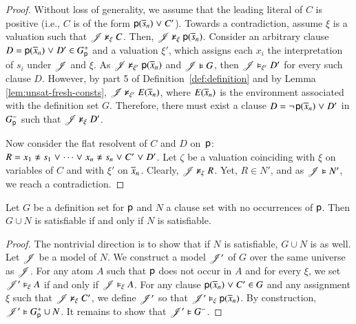 \begin{rep}
\begin{proof}
      Without loss of generality,
      we assume that the leading literal of $C$ is positive (i.e., $C$ is of the form ${\mathsf{p}(\overline{s}_{n})} \mathrel{\lor} C'$).
      Towards a contradiction, assume $\xi$ is a valuation such that $\mathscr{J} \nvDash_\xi C$. Then, $\mathscr{J} \nvDash_\xi
      {\mathsf{p}(\overline{s}_{n})}$. 
      Consider an arbitrary clause $D = {\mathsf{p}}(\overline{x}_{n}) \mathrel{\lor} D'
      \in G^+_{\mathsf{p}}$ and a valuation $\xi'$, which assigns each $x_i$ the
      interpretation of $s_i$ under $\mathscr{J}$ and $\xi$. As $\mathscr{J} \nvDash_{\xi'}
      {\mathsf{p}}(\overline{x}_{n})$ and $\mathscr{J} \vDash G$, then $\mathscr{J} \vDash_{\xi'} D'$ for every
      such clause $D$.
      However, by part 5 of Definition~\ref{def:definition} and by Lemma
      \ref{lem:unsat-fresh-consts}, $\mathscr{J} \nvDash_{\xi'} E(\overline{x}_{n})$, where $E(\overline{x}_{n})$
      is the environment associated with the definition set $G$.
      Therefore, there must exist a clause $D =
      \neg{\kern.2ex \relax{\mathsf{p}(\overline{x}_{n})}} \mathrel{\lor} D'$ in $G^-_{\mathsf{p}}$ such
      that $\mathscr{J} \nvDash_\xi D'$.


      Now consider the flat resolvent of $C$ and $D$ on~$\mathsf{p}$: $R =
      \neqlit{x_1}{s_1} \cor \cdots \cor \neqlit{x_n}{s_n} \cor C' \cor D'$.
      Let $\zeta$ be a valuation coinciding with $\xi$ on variables of $C$
      and with $\xi'$ on $\overline{x}_{n}$.
      Clearly, $\mathscr{J} \nvDash_\zeta R$. Yet, $R \in N'$, and as $\mathscr{J} \vDash N'$, we reach a contradiction.
   \end{proof}

   \begin{lemma}
      \label{lem:flat-res-set-last-step-satisfiability}
      Let $G$ be a definition set for $\mathsf{p}$\confrep{,}{} and $N$ a clause set with no occurrences of $\mathsf{p}$.
      Then $G \cup N$ is satisfiable if and only if $N$ is satisfiable.
   \end{lemma}
   \begin{proof}
      The nontrivial direction is to show that if $N$ is satisfiable, $G \cup N$ is as well.
      Let $\mathscr{J}$ be a model of $N$. We construct a model $\mathscr{J}'$ of $G$ over
      the same universe as $\mathscr{J}$. For any atom $A$ such that $\mathsf{p}$ does not
      occur in $A$ and for every $\xi$, we set $\mathscr{J}' \vDash_\xi A$ if and only if
      $\mathscr{J} \vDash_\xi A$. For any clause ${\mathsf{p}(\overline{x}_{n})} \mathrel{\lor}
      C' \in G$ and any assignment $\xi$ such that $\mathscr{J} \nvDash_\xi C'$, we
      define $\mathscr{J}'$ so that $\mathscr{J}'\vDash_\xi \mathsf{p}(\overline{x}_{n})$. By
      construction, $\mathscr{J}' \vDash G^+_{\mathsf{p}} \cup N$. It remains to show that $\mathscr{J}' \vDash
      G^-_{}$.


\end{proof}
\end{rep}
